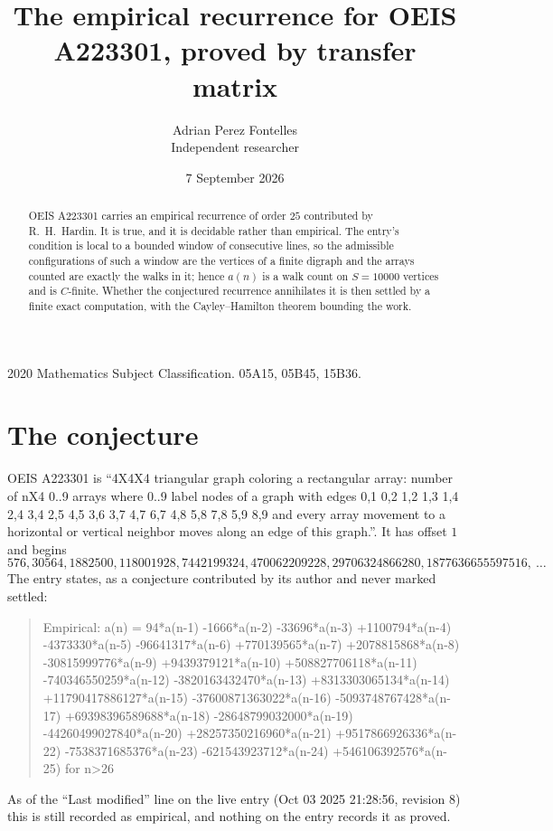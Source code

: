\documentclass[11pt,a4paper]{article}
\title{The empirical recurrence for OEIS A223301, proved by transfer matrix}
\author{Adrian Perez Fontelles\\ \small Independent researcher}
\date{7 September 2026}
\theoremstyle{plain}
\theoremstyle{definition}
\begin{document}
\maketitle

\begin{abstract}
OEIS A223301 carries an empirical recurrence of order $25$ contributed by R.~H.~Hardin. It is
true, and it is decidable rather than empirical. The entry's condition is local to a bounded window of consecutive lines, so
the admissible configurations of such a window are the vertices of a finite digraph and the
arrays counted are exactly the walks in it; hence $a(n)$ is a walk count on $S=10000$ vertices
and is $C$-finite. Whether the conjectured recurrence annihilates it is then settled by a
finite exact computation, with the Cayley--Hamilton theorem bounding the work.
\end{abstract}

\noindent\small 2020 Mathematics Subject Classification. 05A15, 05B45, 15B36.\normalsize

\section{The conjecture}

OEIS A223301 is ``4X4X4 triangular graph coloring a rectangular array: number of nX4 0..9 arrays where 0..9 label nodes of a graph with edges 0,1 0,2 1,2 1,3 1,4 2,4 3,4 2,5 4,5 3,6 3,7 4,7 6,7 4,8 5,8 7,8 5,9 8,9 and every array movement to a horizontal or vertical neighbor moves along an edge of this graph.''. It has offset $1$ and begins
\[
576, 30564, 1882500, 118001928, 7442199324, 470062209228, 29706324866280, 1877636655597516,\ \dots
\]
The entry states, as a conjecture contributed by its author and never marked settled:
\begin{quote}
Empirical: a(n) = 94*a(n-1) -1666*a(n-2) -33696*a(n-3) +1100794*a(n-4) -4373330*a(n-5) -96641317*a(n-6) +770139565*a(n-7) +2078815868*a(n-8) -30815999776*a(n-9) +9439379121*a(n-10) +508827706118*a(n-11) -740346550259*a(n-12) -3820163432470*a(n-13) +8313303065134*a(n-14) +11790417886127*a(n-15) -37600871363022*a(n-16) -5093748767428*a(n-17) +69398396589688*a(n-18) -28648799032000*a(n-19) -44260499027840*a(n-20) +28257350216960*a(n-21) +9517866926336*a(n-22) -7538371685376*a(n-23) -621543923712*a(n-24) +546106392576*a(n-25) for n>26
\end{quote}
As of the ``Last modified'' line on the live entry (Oct 03 2025 21:28:56, revision 8) this is still
recorded as empirical, and nothing on the entry records it as proved.
\end{document}

